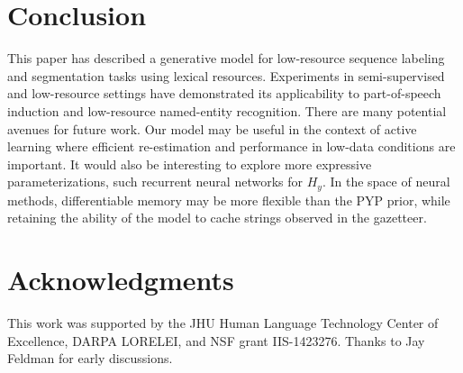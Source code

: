 \documentclass[11pt]{article}
\begin{document}
\section{Conclusion}\label{sec:conclusion}

This paper has described a generative model for low-resource sequence labeling and segmentation tasks using lexical
resources. Experiments in semi-supervised and low-resource settings have demonstrated its applicability to part-of-speech induction and low-resource named-entity recognition.
 There are many potential avenues for future work.
Our model may be useful in the context of active learning where efficient re-estimation and performance in low-data conditions are important.
 It would also be interesting to explore more expressive parameterizations,
 such recurrent neural networks for $H_y$. In the space of neural methods, differentiable memory \cite{DBLP:journals/corr/SantoroBBWL16} may be more flexible than the PYP prior, while retaining the ability of the model to cache strings observed in the gazetteer.

\section*{Acknowledgments}

This work was supported by the JHU Human Language Technology
Center of Excellence, DARPA LORELEI, and NSF grant IIS-1423276.
Thanks to Jay Feldman for early discussions.



\end{document}
